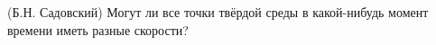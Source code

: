 (Б.Н. Садовский)
Могут ли все точки твёрдой среды в какой-нибудь момент времени иметь 
разные скорости?
